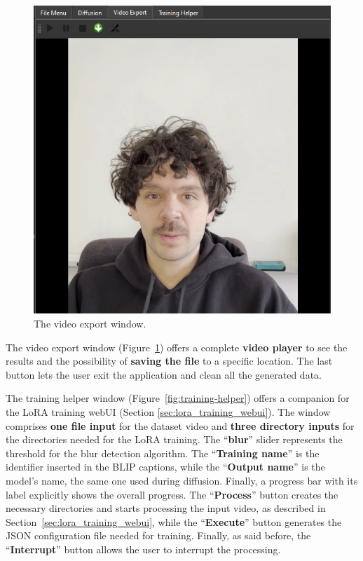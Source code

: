 \documentclass[preprint]{elsarticle}
\begin{document}
\begin{figure}[H]
	\centering
	\includegraphics[scale=0.45, keepaspectratio]{img/project_img/video-window.png}
	\caption{The video export window.}
	\label{fig:video-player}
\end{figure}

The video export window (Figure~\ref{fig:video-player}) offers a complete \textbf{video player} 
to see the results and the possibility of \textbf{saving the file} to a specific location. 
The last button lets the user exit the application and clean all the generated data.


The training helper window (Figure~\ref{fig:training-helper}) offers a companion for the LoRA training webUI (Section \ref{sec:lora_training_webui}). The window comprises \textbf{one file input} for the dataset video and \textbf{three directory inputs}  for the directories needed for the LoRA training. The ``\textbf{blur}'' slider represents the threshold for the blur detection algorithm. The ``\textbf{Training name}'' is the identifier inserted in the BLIP captions, while the ``\textbf{Output name}'' is the model's name, the same one used during diffusion. Finally, a progress bar with its label explicitly shows the overall progress. The ``\textbf{Process}'' button creates the necessary directories and starts processing the input video, as described in Section~\ref{sec:lora_training_webui}, while the ``\textbf{Execute}'' button generates the  JSON configuration file needed for training. Finally, as said before, the ``\textbf{Interrupt}'' button allows the user to interrupt the processing.
\end{document}
